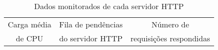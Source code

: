 \begin{table}
\begin{center}
\begin{tabular}{ |c|c|c| } 
 \hline
 Carga média & Fila de pendências & Número de \\ 
  de CPU & do servidor HTTP & requisições respondidas \\
 \hline
\end{tabular}
\end{center}
\label{tab:monitor}
\caption{Dados monitorados de cada servidor HTTP}
\end{table}
